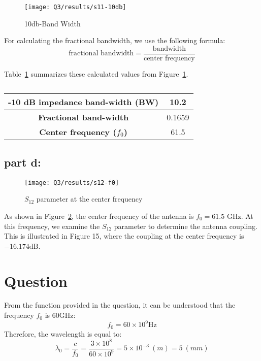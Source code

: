 \documentclass[12pt,onecolumn,a4paper]{article}
\newcommand\question{
	\section{Question \numberstringnum{\thesection}}
}
\begin{document}
	
	
	\begin{figure}[H]
		\centering
		\texttt{[image: Q3/results/s11-10db]}
		\caption{10db-Band Width}
		\label{fig:s11-10db}
	\end{figure}
	
	For calculating the fractional bandwidth, we use the following formula:
	\begin{equation}
		\text{fractional bandwidth} = \frac{\text{bandwidth}}{\text{center frequency}}
	\end{equation}
	
	Table~\ref{tab:s11} summarizes these calculated values from Figure~\ref{fig:s11-10db}.
	
	
	\begin{table}[H]
		\centering
		\caption{}\label{tab:s11}
		\begin{tabular}{cc}
			\toprule
			\textbf{-10 dB impedance band-width (BW)} & 10.2 \\ \midrule		
			\textbf{Fractional band-width} & 0.1659 \\ \midrule
			\textbf{Center frequency ($f_0$)}                & 61.5   \\ 
			\bottomrule
		\end{tabular}
	\end{table}
	

	
	
	\FloatBarrier
	\subsection{part d:}
	
	
		\begin{figure}[H]
		\centering
		\texttt{[image: Q3/results/s12-f0]}
		\caption{$S_{12}$ parameter at the center frequency}
		\label{fig:s12-f0}
	\end{figure}
	
	As shown in Figure~\ref{fig:s12-f0}, the center frequency of the antenna is $f_0 = 61.5$ GHz. At this frequency, we examine the $S_{12}$ parameter to determine the antenna coupling. This is illustrated in Figure 15, where the coupling at the center frequency is $-16.174 \mathrm{dB}$.
	
	
	\FloatBarrier
	\question%
	
	From the function provided in the question, it can be understood that the frequency $f_0$ is $60 \mathrm{GHz}$:
	\begin{equation}
		f_0 = 60 \times 10^9 \mathrm{Hz}
	\end{equation}
	Therefore, the wavelength is equal to:
	\begin{equation}
		\lambda_0 = \frac{c}{f_0} = \frac{3 \times 10^8}{60 \times 10^9} = 5 \times 10^{-3}\ (m) = 5\ (mm)
	\end{equation}
	
\end{document}
